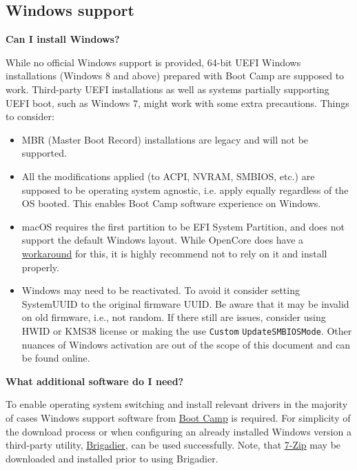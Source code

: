 \documentclass[]{article}
\begin{document}
\subsection{Windows support}\label{troubleshootingwin}

  \textbf{Can I install Windows?}

  While no official Windows support is provided, 64-bit UEFI Windows installations (Windows 8 and
  above) prepared with Boot Camp are supposed to work. Third-party UEFI installations
  as well as systems partially supporting UEFI boot, such as Windows 7, might work with
  some extra precautions. Things to consider:

  \begin{itemize}
  \item MBR (Master Boot Record) installations are legacy and will not be supported.
  \item All the modifications applied (to ACPI, NVRAM, SMBIOS, etc.) are supposed
  to be operating system agnostic, i.e. apply equally regardless of the OS booted.
  This enables Boot Camp software experience on Windows.
  \item macOS requires the first partition to be EFI System Partition, and does
  not support the default Windows layout. While OpenCore does have a
  \href{https://github.com/acidanthera/bugtracker/issues/327}{workaround}
  for this, it is highly recommend not to rely on it and install properly.
  \item Windows may need to be reactivated. To avoid it consider
  setting SystemUUID to the original firmware UUID. Be aware that it may be invalid
  on old firmware, i.e., not random. If there still are issues,
  consider using HWID or KMS38 license or making the use \texttt{Custom}
  \texttt{UpdateSMBIOSMode}. Other nuances of Windows activation are out of the
  scope of this document and can be found online.
  \end{itemize}

  \textbf{What additional software do I need?}

  To enable operating system switching and install relevant drivers in the majority of
  cases Windows support software from
  \href{https://support.apple.com/boot-camp}{Boot Camp} is required. For simplicity of the download
  process or when configuring an already installed Windows version a third-party utility,
  \href{https://github.com/timsutton/brigadier}{Brigadier}, can be used successfully.
  Note, that \href{https://www.7-zip.org}{7-Zip} may be downloaded and installed
  prior to using Brigadier.
\end{document}
